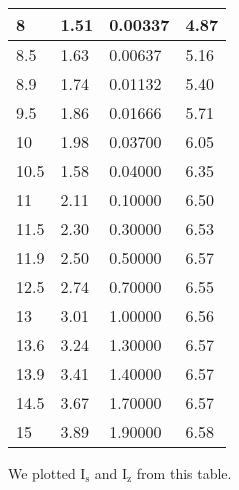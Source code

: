 \documentclass[12pt]{article}
\begin{document}
\begin{longtable}{|l|l|l|l|}
        8      & 1.51    & 0.00337       & 4.87    \\ \hline
        8.5    & 1.63    & 0.00637       & 5.16    \\ \hline
        8.9    & 1.74    & 0.01132       & 5.40    \\ \hline
        9.5    & 1.86    & 0.01666       & 5.71    \\ \hline
        10     & 1.98    & 0.03700       & 6.05    \\ \hline
        10.5   & 1.58    & 0.04000       & 6.35    \\ \hline
        11     & 2.11    & 0.10000       & 6.50    \\ \hline
        11.5   & 2.30    & 0.30000       & 6.53    \\ \hline
        11.9   & 2.50    & 0.50000       & 6.57    \\ \hline
        12.5   & 2.74    & 0.70000       & 6.55    \\ \hline
        13     & 3.01    & 1.00000       & 6.56    \\ \hline
        13.6   & 3.24    & 1.30000       & 6.57    \\ \hline
        13.9   & 3.41    & 1.40000       & 6.57    \\ \hline
        14.5   & 3.67    & 1.70000       & 6.57    \\ \hline
        15     & 3.89    & 1.90000       & 6.58    \\ \hline
\end{longtable}
We plotted \( \mathrm{I_s} \) and \( \mathrm{I_z} \) from this table.
\end{document}
